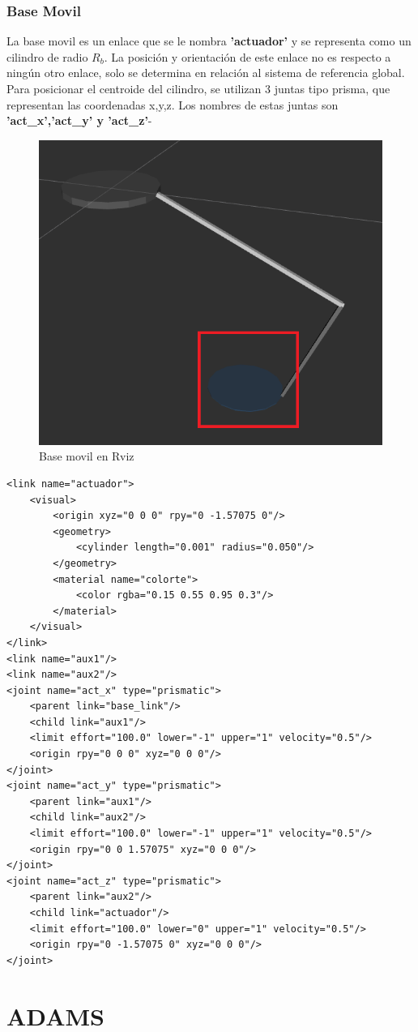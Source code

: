 \begin{lstlisting}
        \end{lstlisting}
       

       \subsubsection{Base Movil}

        La base movil es un enlace que se le nombra \textbf{'actuador'} y se representa como un cilindro de radio \textbf{$R_b$}. La posición y orientación de este enlace no es respecto a ningún otro enlace, solo se determina en relación al sistema de referencia global. Para posicionar el centroide del cilindro, se utilizan 3 juntas tipo prisma, que representan las coordenadas x,y,z. Los nombres de estas juntas son \textbf{'act\_x','act\_y' y 'act\_z'}-

        \begin{figure}[h]
                \centering
                \includegraphics[width=0.4\linewidth]{Main/Chapter6/Images6/cap6_basemovil.png}
                \caption{Base movil en Rviz}
                \label{f:Cap6_urdf_4}
            \end{figure}

        \lstset{language=XML}
        \begin{lstlisting}
<link name="actuador">
	<visual>
		<origin xyz="0 0 0" rpy="0 -1.57075 0"/>
		<geometry>
			<cylinder length="0.001" radius="0.050"/>
		</geometry>
		<material name="colorte">
			<color rgba="0.15 0.55 0.95 0.3"/>
		</material>
	</visual>
</link>
<link name="aux1"/>
<link name="aux2"/>
<joint name="act_x" type="prismatic">
	<parent link="base_link"/>
	<child link="aux1"/>
	<limit effort="100.0" lower="-1" upper="1" velocity="0.5"/>
	<origin rpy="0 0 0" xyz="0 0 0"/>
</joint>
<joint name="act_y" type="prismatic">
	<parent link="aux1"/>
	<child link="aux2"/>
	<limit effort="100.0" lower="-1" upper="1" velocity="0.5"/>
	<origin rpy="0 0 1.57075" xyz="0 0 0"/>
</joint>
<joint name="act_z" type="prismatic">
	<parent link="aux2"/>
	<child link="actuador"/>
	<limit effort="100.0" lower="0" upper="1" velocity="0.5"/>
	<origin rpy="0 -1.57075 0" xyz="0 0 0"/>
</joint>
        \end{lstlisting}

      \newpage
  
  



    \newpage


\section{ADAMS}
